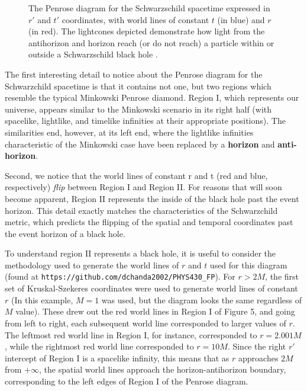 \documentclass{article}
\begin{document}
\begin{figure}[ht]
\begin{center}
\end{center}



\vspace{-40pt}
\caption{The Penrose diagram for the Schwarzschild spacetime expressed in $r'$ and $t'$ coordinates, with world lines of constant $t$ (in blue) and $r$ (in red). The lightcones depicted demonstrate how light from the antihorizon and horizon reach (or do not reach) a particle within or outside a Schwarzschild black hole \cite{anti_horizon}.}
\label{fig:penrose_schwarz}
\end{figure}

The first interesting detail to notice about the Penrose diagram for the Schwarzchild spacetime is that it contains not one, but two regions which resemble the typical Minkowski Penrose diamond. Region I, which represents our universe, appears similar to the Minkowski scenario in its right half (with spacelike, lightlike, and timelike infinities at their appropriate positions). The similarities end, however, at its left end, where the lightlike infinities characteristic of the Minkowski case have been replaced by a \textbf{horizon} and \textbf{anti-horizon}.

Second, we notice that the world lines of constant r and t (red and blue, respectively) \textit{flip} between Region I and Region II. For reasons that will soon become apparent, Region II represents the inside of the black hole past the event horizon. This detail exactly matches the characteristics of the Schwarzchild metric, which predicts the flipping of the spatial and temporal coordinates past the event horizon of a black hole.

To understand region II represents a black hole, it is useful to consider the methodology used to generate the world lines of $r$ and $t$ used for this diagram (found at \texttt{https://github.com/dchanda2002/PHYS430_FP}). For $r>2M$, the first set of Kruskal-Szekeres coordinates were used to generate world lines of constant $r$ (In this example, $M=1$ was used, but the diagram looks the same regardless of $M$ value). These drew out the red world lines in Region I of Figure 5, and going from left to right, each subsequent world line corresponded to larger values of $r$. The leftmost red world line in Region I, for instance, corresponded to $r=2.001M$, while the rightmost red world line corresponded to $r=10M$. Since the right $r'$ intercept of Region I is a spacelike infinity, this means that as $r$ approaches $2M$ from $+\infty$, the spatial world lines approach the horizon-antihorizon boundary, corresponding to the left edges of Region I of the Penrose diagram.
\end{document}
